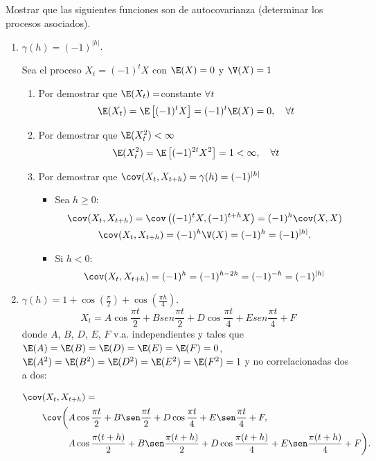 \begin{ejemplo} Mostrar que las siguientes funciones son de autocovarianza (determinar los procesos asociados).

\begin{enumerate}
\item $\gamma (h)=(-1)^{\left| h \right|}$.

Sea el proceso $X_{t} =(-1)^{t}X$ con $\E(X)=0$ y $\V(X)=1$
 
\begin{enumerate}
      \item Por demostrar que $\E(X_{t} )=$constante $\forall t$
	\[
		\E(X_{t} )=\E\left[ {(-1)^{t}X} \right]=(-1)^{t}\E(X)=0,\quad\forall t
	\]
	\item Por demostrar que $\E(X_{t}^{2} )<\infty $
	\[
		\E(X_{t}^{2} )=\E\left[ {(-1)^{2t}X^{2}} \right]=1<\infty,\quad\forall t
	\]
	\item Por demostrar que $\cov (X_{t} ,X_{t+h} )=\gamma (h)=(-1)^{\left| h \right|}$
		\begin{itemize}
		\item Sea $h\geq 0$:
		\begin{gather*}
			 \cov(X_{t} ,X_{t+h} )=\cov\left((-1)^{t}X,(-1)^{t+h}X\right)=(-1)^{h}\cov(X,X)\\
			 \cov(X_{t} ,X_{t+h} )=(-1)^{h}\V(X)=(-1)^{h}=(-1)^{\left| h \right|}.
		\end{gather*}

		\item Si $h< 0$:
		\[
		 \cov(X_{t} ,X_{t+h} )=(-1)^{h}=(-1)^{h-2h}=(-1)^{-h}=(-1)^{\left| h\right|}
		\]
		\end{itemize}
	\end{enumerate}

\item $\gamma (h)=1+\cos \left( {\frac{\pi }{2}} \right)+\cos \left({\frac{\pi h}{4}} \right)$.
\[
	X_{t} =A\cos \frac{\pi t}{2}+Bsen\frac{\pi t}{2}+D\cos \frac{\pi t}{4}+Esen\frac{\pi t}{4}+F
\]
donde $A$, $B$, $D$, $E$, $F$ v.a. independientes y tales que $\E(A)= \E(B)= \E(D)= \E(E)= \E(F)=0$, $\E(A^{2})= \E(B^{2})= \E(D^{2})= \E(E^{2})= \E(F^{2})=1$ y no correlacionadas dos a dos:

\begin{align*}
\cov&(X_{t} ,X_{t+h} )	=\\
	 &\cov\bigg( A\cos \frac{\pi t}{2}+B\sen\frac{\pi t}{2}+D\cos 	\frac{\pi t}{4}+E\sen\frac{\pi t}{4}+F, \\
	&\phantom{\cov\bigg(} A\cos \frac{\pi (t+h)}{2}+B\sen\frac{\pi (t+h)}{2}+D\cos \frac{\pi (t+h)}{4}+E\sen\frac{\pi (t+h)}{4}+F\bigg).
\end{align*}


\end{enumerate}
\end{ejemplo}

